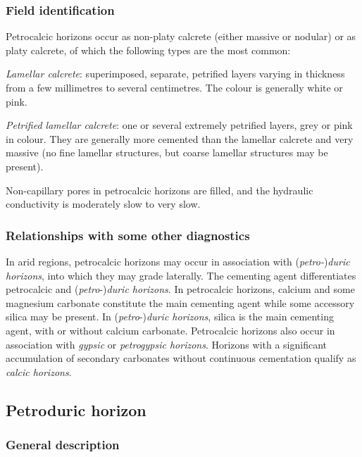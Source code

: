 \documentclass[
  letterpaper,
  DIV=11,
  numbers=noendperiod]{scrreprt}
\begin{document}
\hypertarget{field-identification-17}{%
\subsubsection{Field identification}\label{field-identification-17}}

Petrocalcic horizons occur as non-platy calcrete (either massive or
nodular) or as platy calcrete, of which the following types are the most
common:

\emph{Lamellar calcrete}: superimposed, separate, petrified layers
varying in thickness from a few millimetres to several centimetres. The
colour is generally white or pink.

\emph{Petrified lamellar calcrete}: one or several extremely petrified
layers, grey or pink in colour. They are generally more cemented than
the lamellar calcrete and very massive (no fine lamellar structures, but
coarse lamellar structures may be present).

Non-capillary pores in petrocalcic horizons are filled, and the
hydraulic conductivity is moderately slow to very slow.

\hypertarget{relationships-with-some-other-diagnostics-23}{%
\subsubsection{Relationships with some other
diagnostics}\label{relationships-with-some-other-diagnostics-23}}

In arid regions, petrocalcic horizons may occur in association with
(\emph{petro-})\emph{duric horizons}, into which they may grade
laterally. The cementing agent differentiates petrocalcic and
(\emph{petro}-)\emph{duric horizons}. In petrocalcic horizons, calcium
and some magnesium carbonate constitute the main cementing agent while
some accessory silica may be present. In (\emph{petro}-)\emph{duric
horizons}, silica is the main cementing agent, with or without calcium
carbonate. Petrocalcic horizons also occur in association with
\emph{gypsic} or \emph{petrogypsic horizons}. Horizons with a
significant accumulation of secondary carbonates without continuous
cementation qualify as \emph{calcic horizons}.

\hypertarget{petroduric-horizon}{%
\subsection{Petroduric horizon}\label{petroduric-horizon}}

\hypertarget{general-description-24}{%
\subsubsection{General description}\label{general-description-24}}
\end{document}
